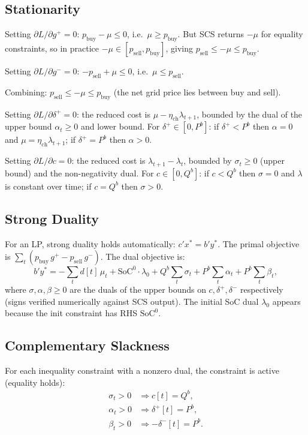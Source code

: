 \documentclass[11pt,a4paper]{article}
\newcommand{\pb}{p_{\text{buy}}}
\newcommand{\ps}{p_{\text{sell}}}
\newcommand{\netload}{d}
\newcommand{\Qb}{{Q^b}}
\newcommand{\Pb}{{P^b}}
\newcommand{\SoC}{{\text{SoC}^0}}
\begin{document}
\subsection{Stationarity}\label{sec:stationarity}

Setting $\partial L / \partial g^+ = 0$: $\pb - \mu \leq 0$, i.e.\ $\mu \geq \pb$. But SCS returns $-\mu$ for equality constraints, so in practice $-\mu \in [\ps, \pb]$, giving $\ps \leq -\mu \leq \pb$.

Setting $\partial L / \partial g^- = 0$: $-\ps + \mu \leq 0$, i.e.\ $\mu \leq \ps$.

Combining: $\ps \leq -\mu \leq \pb$ (the net grid price lies between buy and sell).

Setting $\partial L / \partial \delta^+ = 0$: the reduced cost is $\mu - \eta_{\text{ch}} \lambda_{t+1}$, bounded by the dual of the upper bound $\alpha_t \geq 0$ and lower bound. For $\delta^+ \in [0, \Pb]$: if $\delta^+ < \Pb$ then $\alpha = 0$ and $\mu = \eta_{\text{ch}} \lambda_{t+1}$; if $\delta^+ = \Pb$ then $\alpha > 0$.

Setting $\partial L / \partial c = 0$: the reduced cost is $\lambda_{t+1} - \lambda_t$, bounded by $\sigma_t \geq 0$ (upper bound) and the non-negativity dual. For $c \in [0, \Qb]$: if $c < \Qb$ then $\sigma = 0$ and $\lambda$ is constant over time; if $c = \Qb$ then $\sigma > 0$.

\subsection{Strong Duality}

For an LP, strong duality holds automatically: $c'x^* = b'y^*$. The primal objective is $\sum_t (\pb\, g^+ - \ps\, g^-)$. The dual objective is:
\begin{equation}\label{eq:dual_obj}
    b'y^* = -\sum_t \netload[t]\,\mu_t + \SoC \cdot \lambda_0 + \Qb \sum_t \sigma_t + \Pb \sum_t \alpha_t + \Pb \sum_t \beta_t,
\end{equation}
where $\sigma, \alpha, \beta \geq 0$ are the duals of the upper bounds on $c, \delta^+, \delta^-$ respectively (signs verified numerically against SCS output). The initial SoC dual $\lambda_0$ appears because the init constraint has RHS $\SoC$.

\subsection{Complementary Slackness}

For each inequality constraint with a nonzero dual, the constraint is active (equality holds):
\begin{align}
    \sigma_t > 0 &\Rightarrow c[t] = \Qb, \\
    \alpha_t > 0 &\Rightarrow \delta^+[t] = \Pb, \\
    \beta_t > 0 &\Rightarrow -\delta^-[t] = \Pb.
\end{align}
\end{document}
